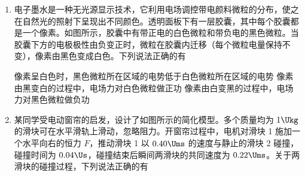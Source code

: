 \documentclass[\gkver]{gaokaozhenti}
\begin{document}
\begin{enumerate}
{C．经过 Q 点时向心加速度大小为 $a = \frac{v_{Q}^{2}}{h} = 9 \Umsq$。C 正确；

D．经过 Q 点时，据牛顿第二定律可得 $F - mg = ma$

解得货物受到的支持力大小为 $F = 380 \UN$

据牛顿第三定律可知，货物对轨道的压力大小为 $380 \UN$，D 正确。

故选 BCD。
}

\item
电子墨水是一种无光源显示技术，它利用电场调控带电颜料微粒的分布，使之在自然光的照射下呈现出不同颜色。透明面板下有一层胶囊，其中每个胶囊都是一个像素。如图所示，胶囊中有带正电的白色微粒和带负电的黑色微粒。当胶囊下方的电极极性由负变正时，微粒在胶囊内迁移（每个微粒电量保持不变），像素由黑色变成白色。下列说法正确的有


{像素呈白色时，黑色微粒所在区域的电势低于白色微粒所在区域的电势}
{像素由黑变白的过程中，电场力对白色微粒做正功}
{像素由白变黑的过程中，电场力对黑色微粒做负功}


\item
某同学受电动窗帘的启发，设计了如图所示的简化模型。多个质量均为 $1 \Ukg$ 的滑块可在水平滑轨上滑动，忽略阻力。开窗帘过程中，电机对滑块 1 施加一个水平向右的恒力 $F$，推动滑块 1 以 $0.40 \Ums$ 的速度与静止的滑块 2 碰撞，碰撞时间为 $0.04 \Us$，碰撞结束后瞬间两滑块的共同速度为 $0.22 \Ums$。关于两滑块的碰撞过程，下列说法正确的有


\end{enumerate}
\end{document}
